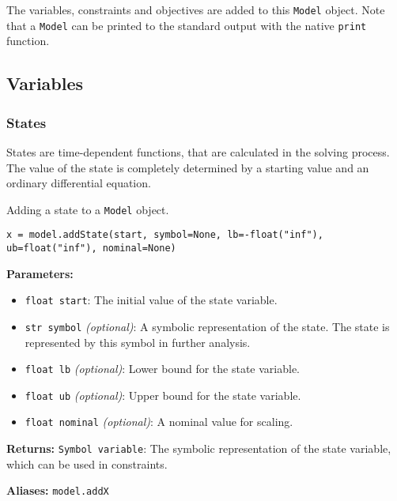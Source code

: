 \documentclass[12pt]{article}
\begin{document}
The variables, constraints and objectives are added to this
\texttt{Model} object. Note that a \texttt{Model} can be printed to the
standard output with the native \texttt{print} function.

\subsection{Variables}

\subsubsection{States}

States are time-dependent functions, that are calculated in the
solving process. The value of the state is completely determined by a starting
value and an ordinary differential equation.

\begin{mdframed}[backgroundcolor=gray!10, roundcorner=10pt, linewidth=1pt]

	Adding a state to a \texttt{Model} object.

	\begin{lstlisting}
x = model.addState(start, symbol=None, lb=-float("inf"), ub=float("inf"), nominal=None)
	\end{lstlisting}\label{addState}

	\textbf{Parameters:}
	\begin{itemize}
		\item \texttt{float start}: The initial value of the state
		      variable.
		\item \texttt{str symbol} \emph{(optional)}: A symbolic
		      representation of the state. The state is
		      represented by this symbol in
		      further analysis.
		\item \texttt{float lb} \emph{(optional)}: Lower bound for the
		      state variable.
		\item \texttt{float ub} \emph{(optional)}: Upper bound for the
		      state variable.
		\item \texttt{float nominal} \emph{(optional)}: A nominal value
		      for scaling.
	\end{itemize}

	\textbf{Returns:}
	\texttt{Symbol variable}: The symbolic representation of the state
	variable, which can be used in constraints.

	\textbf{Aliases:} \texttt{model.addX}
\end{mdframed}
\end{document}
